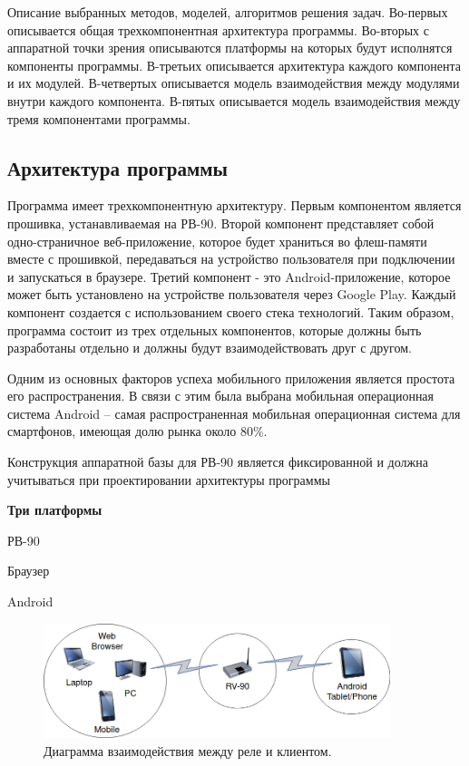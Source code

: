 Описание выбранных методов, моделей, алгоритмов решения задач.
Во-первых описывается общая трехкомпонентная архитектура программы.
Во-вторых с аппаратной точки зрения описываются платформы на которых будут исполнятся компоненты программы.
В-третьих описывается архитектура каждого компонента и их модулей.
В-четвертых описывается модель взаимодействия между модулями внутри каждого компонента.
В-пятых описывается модель взаимодействия между тремя компонентами программы.

\subsection{ Архитектура программы }
Программа имеет трехкомпонентную архитектуру. Первым компонентом является прошивка, устанавливаемая на РВ-90. Второй компонент представляет собой одно-страничное веб-приложение, которое будет храниться во флеш-памяти вместе с прошивкой, передаваться на устройство пользователя при подключении и запускаться в браузере. Третий компонент - это Android-приложение, которое может быть установлено на устройстве пользователя через Google Play. Каждый компонент создается с использованием своего стека технологий. Таким образом, программа состоит из трех отдельных компонентов, которые должны быть разработаны отдельно и должны будут взаимодействовать друг с другом. 

Одним из основных факторов успеха мобильного приложения является простота его  распространения.  В связи с этим была выбрана мобильная операционная система  Android – самая распространенная мобильная операционная система для смартфонов, имеющая долю рынка около 80\%.
 
Конструкция аппаратной базы для РВ-90 является фиксированной и должна учитываться при проектировании архитектуры программы

\textbf{Три платформы}
\begin{my_itemize}
\item РВ-90
\item Браузер
\item Android
\end{my_itemize}


\begin{figure}[h!]
    \centering
    \includegraphics[width=0.9\textwidth]{three_platforms.png}
    \caption{Диаграмма взаимодействия между реле и клиентом.}
\end{figure}



